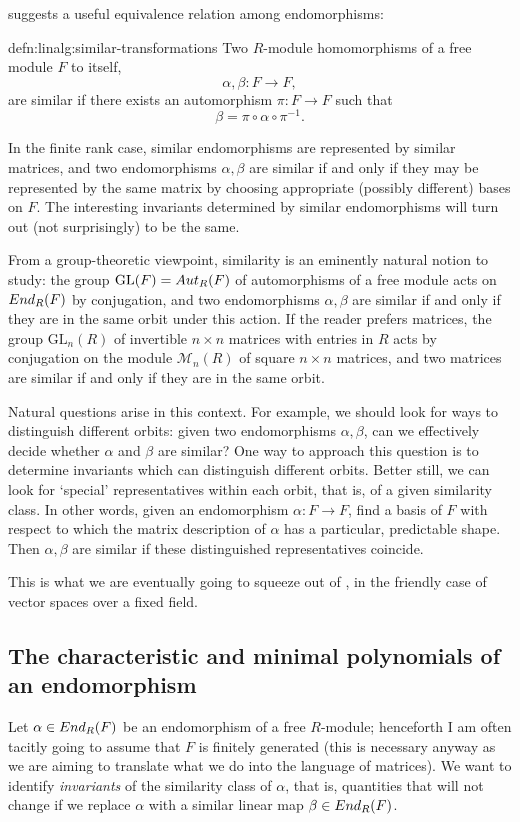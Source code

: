 suggests a useful equivalence relation among
endomorphisms:
\begin{defn}{}{defn:linalg:similar-transformations}
  Two $R$-module homomorphisms of a free module $F$ to itself,
  \[
    \alpha, \beta : F \to F,
  \]
  are similar if there exists an automorphism $\pi : F \to F$ such
  that
  \[
    \beta = \pi \circ \alpha \circ \pi^{-1}.
  \]
\end{defn}
In the finite rank case, similar endomorphisms are represented by
similar matrices, and two endomorphisms $\alpha, \beta$ are similar if
and only if they may be represented by the same matrix by choosing
appropriate (possibly different) bases on $F$. The interesting
invariants determined by similar endomorphisms will turn out (not
surprisingly) to be the same.

From a group-theoretic viewpoint, similarity is an eminently natural
notion to study: the group $\mathrm{GL}(F) = Aut_R(F)$ of
automorphisms of a free module acts on $End_R(F)$ by conjugation, and
two endomorphisms $\alpha, \beta$ are similar if and only if they are
in the same orbit under this action. If the reader prefers matrices,
the group $\mathrm{GL}_n(R)$ of invertible $n \times n$ matrices with
entries in $R$ acts by conjugation on the module $\mathcal{M}_n(R)$ of
square $n \times n$ matrices, and two matrices are similar if and only
if they are in the same orbit.

Natural questions arise in this context. For example, we should look
for ways to distinguish different orbits: given two endomorphisms
$\alpha, \beta$, can we effectively decide whether $\alpha$ and
$\beta$ are similar? One way to approach this question is to determine
invariants which can distinguish different orbits. Better still, we
can look for `special' representatives within each orbit, that is, of
a given similarity class. In other words, given an endomorphism
$\alpha : F \to F$, find a basis of $F$ with respect to which the
matrix description of $\alpha$ has a particular, predictable shape.
Then $\alpha, \beta$ are similar if these distinguished
representatives coincide.

This is what we are eventually going to squeeze out of
, in the friendly case of vector spaces over a fixed
field.

\subsection{The characteristic and minimal polynomials of an
  endomorphism}
\label{subsec:linalg:the-characteristic-and-minimal-polynomials-of-an-endomorphism}
Let $\alpha \in End_R(F)$ be an endomorphism of a free $R$-module;
henceforth I am often tacitly going to assume that $F$ is finitely
generated (this is necessary anyway as we are aiming to translate what
we do into the language of matrices). We want to identify
\emph{invariants} of the similarity class of $\alpha$, that is,
quantities that will not change if we replace $\alpha$ with a similar
linear map $\beta \in
End_R(F)$.

